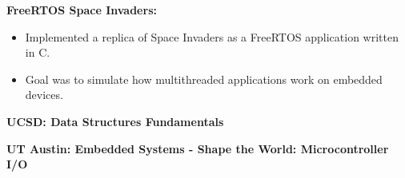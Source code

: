 \begin{cventries}
  \cventry
    {} %
    {} %
    {} %
    {} %
    {
      \begin{cvitems} %
        \item { \textbf{FreeRTOS Space Invaders:}
                \begin{itemize}
                    \item Implemented a replica of Space Invaders as a FreeRTOS application written in C.
                    \item Goal was to simulate how multithreaded applications work on embedded devices.
                \end{itemize}
              }
          \vspace{1.5mm}
          \item { \textbf{UCSD: Data Structures Fundamentals} }
          \vspace{1.5mm}
          \item { \textbf{UT Austin: Embedded Systems - Shape the World: Microcontroller I/O} }
       \end{cvitems}
    }
\end{cventries}
